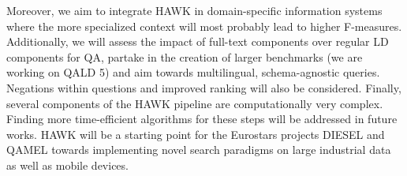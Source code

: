 Moreover, we aim to integrate HAWK in domain-specific information systems where the more specialized context will most probably lead to higher F-measures. Additionally, we will assess the impact of full-text components over regular LD components for QA, partake in the creation of larger benchmarks (we are working on \ac{QALD} 5) and aim towards multilingual, schema-agnostic queries. Negations within questions and improved ranking will also be considered. Finally, several components of the HAWK pipeline are computationally very complex. Finding more time-efficient algorithms for these steps will be addressed in future works.
HAWK will be a starting point for the Eurostars projects DIESEL and QAMEL towards implementing novel search paradigms on large industrial data as well as mobile devices.

